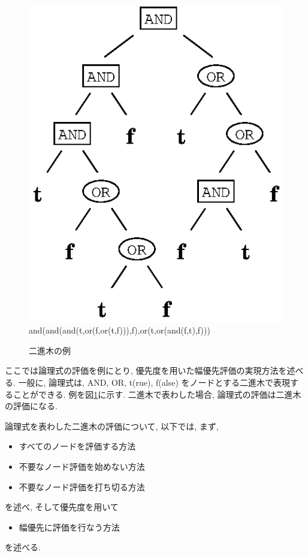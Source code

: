 \documentclass[a4,titlepage]{jsreport}
\begin{document}
\begin{figure}
\begin{center}
\includegraphics{fig/andor_tree2_exp.eps}\\
and(and(and(t,or(f,or(t,f))),f),or(t,or(and(f,t),f)))
\caption{二進木の例}
\label{andor_tree2_exp}
\end{center}
\end{figure}

ここでは論理式の評価を例にとり, 優先度を用いた幅優先評価の実現方法を述べる.  
一般に, 論理式は, 
AND, OR, t(rue), f(alse) をノードとする二進木で表現することができる.  
例を図\ref{andor_tree2_exp}に示す.  
二進木で表わした場合, 論理式の評価は二進木の評価になる.  

論理式を表わした二進木の評価について, 以下では, まず, 
\begin{itemize}
\item すべてのノードを評価する方法
\item 不要なノード評価を始めない方法
\item 不要なノード評価を打ち切る方法
\end{itemize}
を述べ, そして優先度を用いて
\begin{itemize}
\item 幅優先に評価を行なう方法
\end{itemize}
を述べる.  
\end{document}

